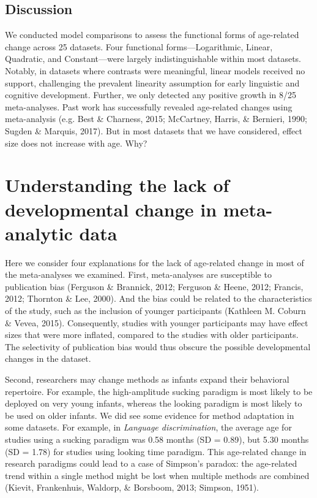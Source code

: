 \documentclass[
  man]{apa6}
\begin{document}
\hypertarget{discussion}{%
\subsection{Discussion}\label{discussion}}

We conducted model comparisons to assess the functional forms of age-related change across 25 datasets. Four functional forms---Logarithmic, Linear, Quadratic, and Constant---were largely indistinguishable within most datasets. Notably, in datasets where contrasts were meaningful, linear models received no support, challenging the prevalent linearity assumption for early linguistic and cognitive development. Further, we only detected any positive growth in 8/25 meta-analyses. Past work has successfully revealed age-related changes using meta-analysis (e.g. Best \& Charness, 2015; McCartney, Harris, \& Bernieri, 1990; Sugden \& Marquis, 2017). But in most datasets that we have considered, effect size does not increase with age. Why?

\hypertarget{understanding-the-lack-of-developmental-change-in-meta-analytic-data}{%
\section{Understanding the lack of developmental change in meta-analytic data}\label{understanding-the-lack-of-developmental-change-in-meta-analytic-data}}

Here we consider four explanations for the lack of age-related change in most of the meta-analyses we examined. First, meta-analyses are susceptible to publication bias (Ferguson \& Brannick, 2012; Ferguson \& Heene, 2012; Francis, 2012; Thornton \& Lee, 2000). And the bias could be related to the characteristics of the study, such as the inclusion of younger participants (Kathleen M. Coburn \& Vevea, 2015). Consequently, studies with younger participants may have effect sizes that were more inflated, compared to the studies with older participants. The selectivity of publication bias would thus obscure the possible developmental changes in the dataset.

Second, researchers may change methods as infants expand their behavioral repertoire. For example, the high-amplitude sucking paradigm is most likely to be deployed on very young infants, whereas the looking paradigm is most likely to be used on older infants. We did see some evidence for method adaptation in some datasets. For example, in \emph{Language discrimination}, the average age for studies using a sucking paradigm was 0.58 months (SD = 0.89), but 5.30 months (SD = 1.78) for studies using looking time paradigm. This age-related change in research paradigms could lead to a case of Simpson's paradox: the age-related trend within a single method might be lost when multiple methods are combined (Kievit, Frankenhuis, Waldorp, \& Borsboom, 2013; Simpson, 1951).
\end{document}
